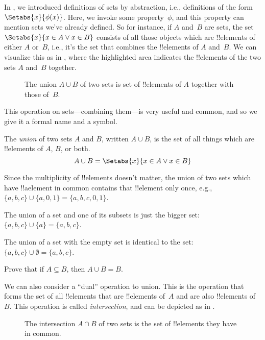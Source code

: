 \documentclass[../../../include/open-logic-section]{subfiles}
\begin{document}

\begin{explain}
In , we introduced definitions of sets by
abstraction, i.e., definitions of the form $\Setabs{x}{\phi(x)}$.
Here, we invoke some property~$\phi$, and this property can mention
sets we've already defined. So for instance, if $A$ and~$B$ are sets,
the set $\Setabs{x}{x \in A \lor x \in B}$ consists of all those
objects which are !!{element}s of either $A$ or~$B$, i.e., it's the
set that combines the !!{element}s of $A$ and~$B$. We can visualize
this as in , where the highlighted area indicates the
!!{element}s of the two sets $A$ and~$B$ together.

\begin{figure}
  \centering
  \caption{The union $A \cup B$ of two sets is set of !!{element}s of
   $A$ together with those of~$B$.}
\end{figure}

This operation on sets---combining them---is very useful and common,
and so we give it a formal name and a symbol. 
\end{explain}

\begin{defn}[Union]
The \emph{union} of two sets $A$ and $B$, written $A \cup B$, is the
set of all things which are !!{element}s of $A$, $B$, or both.
\[
A \cup B = \Setabs{x}{x \in A \lor x \in B}
\]
\end{defn}

\begin{ex}
Since the multiplicity of !!{element}s doesn't matter, the union of two
sets which have !!a{element} in common contains that !!{element} only once,
e.g., $\{ a, b, c\} \cup \{ a, 0, 1\} = \{a, b, c, 0, 1\}$.

The union of a set and one of its subsets is just the bigger set: $\{a,
b, c \} \cup \{a \} = \{a, b, c\}$.

The union of a set with the empty set is identical to the set: $\{a,
b, c \} \cup \emptyset = \{a, b, c \}$.
\end{ex}

\begin{prob}
Prove that if $A \subseteq B$, then $A \cup B = B$.
\end{prob}

\begin{explain}
We can also consider a ``dual'' operation to union. This is the
operation that forms the set of all !!{element}s that are !!{element}s
of~$A$ and are also !!{element}s of~$B$. This operation is called 
\emph{intersection}, and can be depicted as in .
\begin{figure}
  \centering
  \caption{The intersection $A \cap B$ of two sets is the set of
    !!{element}s they have in common.}
\end{figure}
\end{explain}
\end{document}

